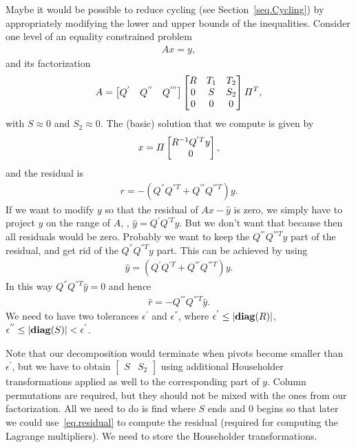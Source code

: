 \documentclass[12pt]{article}
\begin{document}
Maybe it would be possible to reduce cycling (see Section~\ref{seq.Cycling}) by appropriately
modifying the lower and upper bounds of the inequalities. Consider one level of an equality
constrained problem
%
\begin{align*}
  Ax = y,
\end{align*}
%
and its factorization
%
\begin{align*}
  A = \begin{bmatrix} Q^{'}
    & Q^{''} & Q^{'''} \end{bmatrix}
  \begin{bmatrix}
    R & T_1 & T_2 \\
    0 & S   & S_2 \\
    0& 0   & 0
  \end{bmatrix} \mathnormal{\Pi}^T,
\end{align*}
%
with $S\approx0$ and $S_2\approx 0$. The (basic) solution that we compute is given by
%
\begin{align} \label{eq.basic_solution}
  x = \mathnormal{\Pi}\begin{bmatrix} R^{-1}Q^{'T}y \\ 0 \end{bmatrix},
\end{align}
%
and the residual is
%
\begin{align*}
  r = -(Q^{''}Q^{''T} + Q^{'''}Q^{'''T})y.
\end{align*}
%
If we want to modify $y$ so that the residual of $Ax-\hat{y}$ is zero, we simply have to project $y$
on the range of $A$, \ie, $\hat{y} = Q^{'}Q^{'T}y$. But we don't want that because then all
residuals would be zero. Probably we want to keep the $Q^{'''}Q^{'''T}y$ part of the residual, and
get rid of the $Q^{''}Q^{''T}y$ part. This can be achieved by using
%
\begin{align*}
\hat{y} = (Q^{'}Q^{'T} + Q^{'''}Q^{'''T})y.
\end{align*}
%
In this way $Q^{''}Q^{''T}\hat{y} = 0$ and hence
%
\begin{align} \label{eq.residual}
  \hat{r} = -Q^{'''}Q^{'''T}\hat{y}.
\end{align}
%
We need to have two tolerances $\epsilon^{'}$ and $\epsilon^{''}$, where $\epsilon^{'} \leq
\left\lvert\mathop{\bf diag}(R)\right\rvert$, $\epsilon^{''} \leq \left\lvert\mathop{\bf diag}(S)\right\rvert < \epsilon^{'}$.

Note that our decomposition would terminate when pivots become smaller than $\epsilon^{'}$, but we
have to obtain $\begin{bmatrix} S & S_2\end{bmatrix}$ using additional Householder transformations
  applied as well to the corresponding part of $y$. Column permutations are required, but they
  should not be mixed with the ones from our factorization. All we need to do is find where $S$ ends
  and $0$ begins so that later we could use~\eqref{eq.residual} to compute the residual (required
  for computing the Lagrange multipliers). We need to store the Householder transformations.
\end{document}
